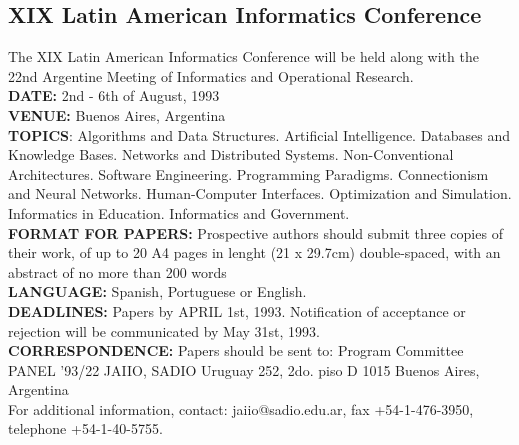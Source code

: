 \subsection{XIX Latin American Informatics Conference}
The XIX Latin American Informatics Conference will be held along with
the 22nd Argentine Meeting of Informatics and Operational Research.\\
{\bf DATE:} 2nd - 6th of August, 1993\\
{\bf VENUE:} Buenos Aires, Argentina\\
{\bf TOPICS}:
    Algorithms and Data Structures.
    Artificial Intelligence.
    Databases and Knowledge Bases.
    Networks and Distributed Systems.
    Non-Conventional Architectures.
    Software Engineering.
    Programming Paradigms.
    Connectionism and Neural Networks.
    Human-Computer Interfaces.
    Optimization and Simulation.
    Informatics in Education.
    Informatics and Government.\\
{\bf FORMAT FOR PAPERS:}
Prospective authors should submit three copies of their work, of up to
20 A4 pages in lenght (21 x 29.7cm) double-spaced, with an abstract of
no more than 200 words\\
{\bf LANGUAGE:} Spanish, Portuguese or English.\\
{\bf DEADLINES:} Papers by APRIL 1st, 1993. Notification of acceptance or
rejection will be communicated by May 31st, 1993.\\
{\bf CORRESPONDENCE:}
Papers should be sent to:
  Program Committee
  PANEL '93/22 JAIIO, SADIO
  Uruguay 252, 2do. piso D
  1015 Buenos Aires, Argentina\\
For additional information, contact: 
jaiio@sadio.edu.ar, fax +54-1-476-3950,
telephone +54-1-40-5755.

